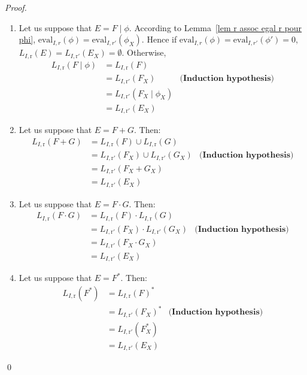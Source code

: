 \documentclass[a4paper]{llncs}
\begin{document}
\begin{proof}
\begin{enumerate}
      \item Let us suppose that $E=F\mid\phi$.
        According to Lemma~\ref{lem r assoc egal r pour phi}, $\mathrm{eval}_{I,r}(\phi)=\mathrm{eval}_{I,r'}(\phi_X)$.
        Hence if $\mathrm{eval}_{I,r}(\phi)=\mathrm{eval}_{I,r'}(\phi')=0$, $L_{I,\mathrm{r}}(E)=L_{I,\mathrm{r}'}(E_X)=\emptyset$.
        Otherwise,
        \begin{align*}
            L_{I,\mathrm{r}}(F\mid\phi) & =L_{I,\mathrm{r}}(F)\\
            & =L_{I,\mathrm{r}'}(F_X)&\textbf{(Induction hypothesis)}\\
            & =L_{I,\mathrm{r}'}(F_X\mid\phi_X)\\
            & =L_{I,\mathrm{r}'}(E_X)
        \end{align*}
      \item Let us suppose that $E=F+G$.
        Then:
        \begin{align*}
            L_{I,\mathrm{r}}(F+G) & =L_{I,\mathrm{r}}(F)\cup L_{I,\mathrm{r}}(G)\\
            & =L_{I,\mathrm{r}'}(F_X)\cup L_{I,\mathrm{r}'}(G_X)&\textbf{(Induction hypothesis)}\\
            & =L_{I,\mathrm{r}'}(F_X+G_X)\\
            & =L_{I,\mathrm{r}'}(E_X)
        \end{align*}
        
      \item Let us suppose that $E=F\cdot G$.
        Then:
        \begin{align*}
            L_{I,\mathrm{r}}(F\cdot G) & =L_{I,\mathrm{r}}(F)\cdot L_{I,\mathrm{r}}(G)\\
            & =L_{I,\mathrm{r}'}(F_X)\cdot L_{I,\mathrm{r}'}(G_X)&\textbf{(Induction hypothesis)}\\
            & =L_{I,\mathrm{r}'}(F_X\cdot G_X)\\
            & =L_{I,\mathrm{r}'}(E_X)
        \end{align*}
      \item Let us suppose that $E=F^*$.
        Then:
        \begin{align*}
            L_{I,\mathrm{r}}(F^*) & =L_{I,\mathrm{r}}(F)^*\\
            & =L_{I,\mathrm{r}'}(F_X)^*&\textbf{(Induction hypothesis)}\\
            & =L_{I,\mathrm{r}'}(F_X^*)\\
            & =L_{I,\mathrm{r}'}(E_X)
        \end{align*}
    \end{enumerate}
    \qed
  \end{proof}
  
\end{document}
